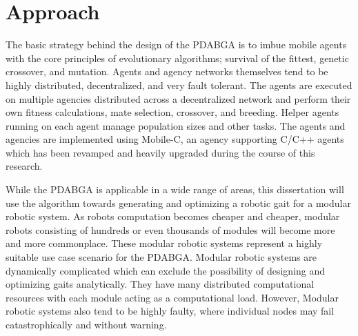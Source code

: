   \section{Approach} %
    The basic strategy behind the design of the PDABGA is to imbue mobile 
      agents with the core principles of evolutionary algorithms; survival 
      of the fittest, genetic crossover, and mutation. 
    Agents and agency networks themselves tend to be highly distributed, 
      decentralized, and very fault tolerant. 
    The agents are executed on multiple agencies distributed across a 
      decentralized network and perform their own fitness calculations, mate
      selection, crossover, and breeding. 
    Helper agents running on each agent manage population sizes and other
      tasks.   
    The agents and agencies are implemented using Mobile-C, an agency
      supporting C/C++ agents which has been revamped and heavily upgraded during
      the course of this research.

    While the PDABGA is applicable in a wide range of areas,
      this dissertation will use the algorithm towards generating and
      optimizing a robotic gait for a modular robotic system.
    As robots computation becomes cheaper and cheaper, modular robots
      consisting of hundreds or even thousands of modules will become 
      more and more commonplace.
    These modular robotic systems represent a highly suitable use case scenario
      for the PDABGA. 
    Modular robotic systems are dynamically complicated which can exclude the
      possibility of designing and optimizing gaits analytically. 
    They have many distributed computational resources with each module acting
      as a computational load.
    However, Modular robotic systems also tend to be highly faulty, where
      individual nodes may fail catastrophically and without warning.

